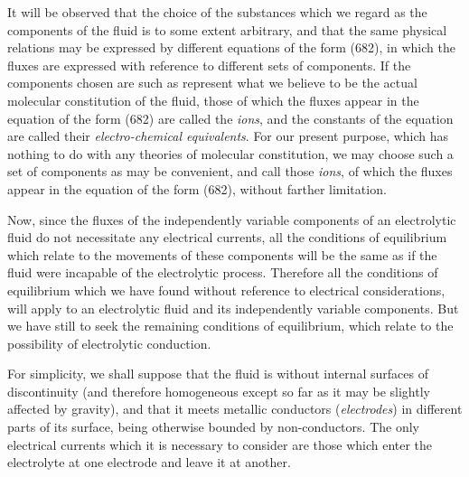 \documentclass[12pt]{article}
\begin{document}
It will be observed that the choice of the substances which we regard as the components of the fluid is to some extent arbitrary, and that the same physical relations may be expressed by different equations of the form (682), in which the fluxes are expressed with reference to different sets of components. If the components chosen are such as represent what we believe to be the actual molecular constitution of the fluid, those of which the fluxes appear in the equation of the form (682) are called the \textit{ions}, and the constants of the equation are called their \textit{electro-chemical equivalents}. For our present purpose, which has nothing to do with any theories of molecular constitution, we may choose such a set of components as may be convenient, and call those \textit{ions}, of which the fluxes appear in the equation of the form (682), without farther limitation.

Now, since the fluxes of the independently variable components of an electrolytic fluid do not necessitate any electrical currents, all the conditions of equilibrium which relate to the movements of these components will be the same as if the fluid were incapable of the electrolytic process. Therefore all the conditions of equilibrium which we have found without reference to electrical considerations, will apply to an electrolytic fluid and its independently variable components. But we have still to seek the remaining conditions of equilibrium, which relate to the possibility of electrolytic conduction.

For simplicity, we shall suppose that the fluid is without internal surfaces of discontinuity (and therefore homogeneous except so far as it may be slightly affected by gravity), and that it meets metallic conductors (\textit{electrodes}) in different parts of its surface, being otherwise bounded by non-conductors. The only electrical currents which it is necessary to consider are those which enter the electrolyte at one electrode and leave it at another.
\end{document}
